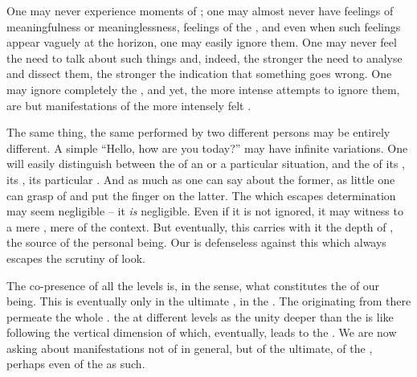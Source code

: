 {  One may never experience moments of ; one may almost never have
  feelings of meaningfulness or meaninglessness, feelings of the , and even when such feelings appear vaguely at the horizon, one
  may easily ignore them. One may never feel the need to talk about such things
  and, indeed, the stronger the need to analyse and dissect them, the stronger
  the indication that something goes wrong. One may ignore completely the
  , 
  and yet, the more intense attempts to ignore them, are but manifestations of
  the more intensely felt .

The same thing, the same  performed by two different persons 
may be entirely different. A simple ``Hello, how are you today?'' may 
have infinite variations. One will easily distinguish between the 
 of an  or a particular situation, and the  
of its , its , its particular . And as 
much as one can say about the former, as little one can grasp of and put 
the finger on the latter. The  which escapes  
determination may seem negligible --  it {\em is} 
negligible. Even if it is not ignored, it may witness to a mere 
, mere  of the context. But eventually, this  
carries with it the depth of , the source of the 
personal being. Our  is defenseless against this 
 which always escapes the scrutiny of  look. 


%

\pa
The co-presence of all the levels is, in the sense, what constitutes 
the  of our being. This  is eventually  only in the 
ultimate , in the . The 
 originating from there permeate the whole 
.  the  at different levels 
as the unity  deeper than the  is like 
following the vertical dimension of  which, eventually, 
leads to the .
We are now asking about manifestations not of 
 in general, but of the ultimate, of the , 
perhaps even of the  as such.

}
